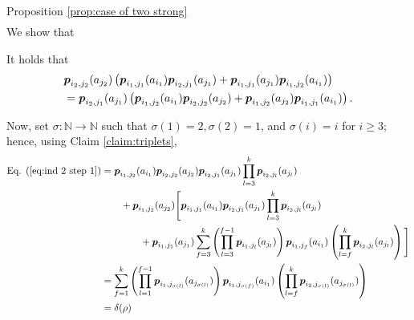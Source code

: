\begin{proofof}{Proposition \ref{prop:case of two strong}}
{\begin{align}
\end{align}}%
We show that
\begin{claim}\label{claim:triplets}
It holds that
\begin{align*}
&\boldsymbol{ p }_{{i_2},{j_2}}(a_{j_2})\left( \boldsymbol{ p }_{{i_1},{j_1}}(a_{i_1})\boldsymbol{ p }_{{i_2},{j_1}}(a_{j_1})+\boldsymbol{ p }_{{i_1},{j_1}}(a_{j_1})\boldsymbol{ p }_{{i_1},{j_2}}(a_{i_1})\right)\\
&=\boldsymbol{ p }_{{i_2},{j_1}}(a_{j_1})\left(\boldsymbol{ p }_{{i_1},{j_2}}(a_{i_1})\boldsymbol{ p }_{{i_2},{j_2}}(a_{j_2})+\boldsymbol{ p }_{{i_1},{j_2}}(a_{j_2})\boldsymbol{ p }_{{i_1},{j_1}}(a_{i_1})  \right).
\end{align*}
\end{claim}
Now, set $\sigma:\mathbb N \rightarrow \mathbb N$ such that $\sigma(1)=2, \sigma(2)=1$, and $\sigma(i)=i$ for $i\geq 3$; hence, using Claim \ref{claim:triplets},
\begin{align}
\textnormal{Eq. (\ref{eq:ind 2 step 1})}
& =\boldsymbol{ p }_{{i_1},{j_2}}(a_{i_1})\boldsymbol{ p }_{{i_2},{j_2}}(a_{j_2})\boldsymbol{ p }_{{i_2},{j_1}}(a_{j_1})\prod_{l=3}^{k} \boldsymbol{ p }_{{i_2},{j_l}}(a_{j_l})\nonumber\\
&\qquad+ \boldsymbol{ p }_{{i_1},{j_2}}(a_{j_2}) \Bigg[\boldsymbol{ p }_{{i_1},{j_1}}(a_{i_1})\boldsymbol{ p }_{{i_2},{j_1}}(a_{j_1}) \prod_{l=3}^{k} \boldsymbol{ p }_{{i_2},{j_l}}(a_{j_l})\nonumber\\
&\qquad \qquad + \boldsymbol{ p }_{{i_1},{j_1}}(a_{j_1})\sum_{f=3}^{k} \left(\prod_{l=3}^{f-1} \boldsymbol{ p }_{{i_1},{j_l}}(a_{j_l})\right) \boldsymbol{ p }_{{i_1},{j_f}}(a_{i_1}) \left(\prod_{l=f}^{k} \boldsymbol{ p }_{{i_2},{j_l}}(a_{j_l})\right) \Bigg]\nonumber\\
&= \sum_{f=1}^{k} \left(\prod_{l=1}^{f-1} \boldsymbol{ p }_{{i_1},{j_{\sigma(l)}}}(a_{j_{\sigma(l)}})\right) \boldsymbol{ p }_{{i_1},{j_{\sigma (f)}}}(a_{i_1}) \left(\prod_{l=f}^{k} \boldsymbol{ p }_{{i_2},{j_{\sigma(l)}}}(a_{j_{\sigma(l)}})\right)\nonumber\\
&=\delta(\rho)
\end{align}

\end{proofof}
